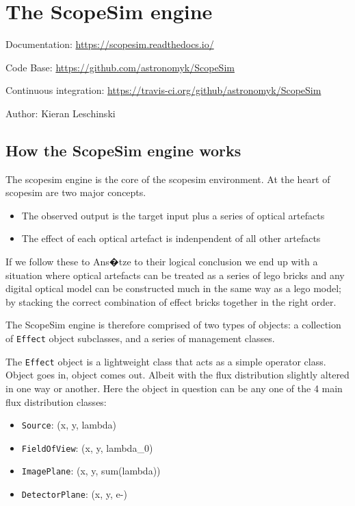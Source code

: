 

\section{The ScopeSim engine%
  \label{the-scopesim-engine}%
}

Documentation: \url{https://scopesim.readthedocs.io/}

Code Base: \url{https://github.com/astronomyk/ScopeSim}

Continuous integration: \url{https://travis-ci.org/github/astronomyk/ScopeSim}

Author: Kieran Leschinski


\subsection{How the ScopeSim engine works%
  \label{how-the-scopesim-engine-works}%
}

The scopesim engine is the core of the scopesim environment.
At the heart of scopesim are two major concepts.

\begin{itemize}
\item The observed output is the target input plus a series of optical artefacts

\item The effect of each optical artefact is indenpendent of all other artefacts
\end{itemize}

If we follow these to Ans�tze to their logical conclusion we end up with a situation where optical artefacts can be treated as a series of \textquotedbl{}lego bricks\textquotedbl{} and any digital optical model can be constructed much in the same way as a lego model; by stacking the correct combination of effect \textquotedbl{}bricks\textquotedbl{} together in the right order.

The ScopeSim engine is therefore comprised of two types of objects: a collection of \texttt{Effect} object subclasses, and a series of \textquotedbl{}management\textquotedbl{} classes.

The \texttt{Effect} object is a lightweight class that acts as a simple operator class.
Object goes in, object comes out.
Albeit with the flux distribution slightly altered in one way or another.
Here the object in question can be any one of the 4 main flux distribution classes:

\begin{itemize}
\item \texttt{Source}: (x, y, lambda)

\item \texttt{FieldOfView}: (x, y, lambda\_0)

\item \texttt{ImagePlane}: (x, y, sum(lambda))

\item \texttt{DetectorPlane}: (x, y, e-)
\end{itemize}

